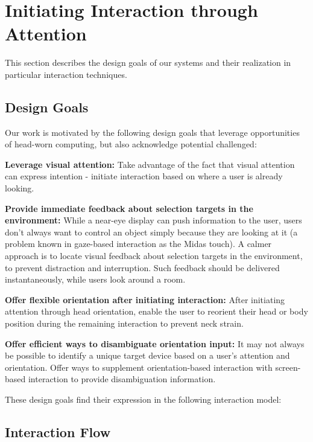 \section{Initiating Interaction through Attention}
This section describes the design goals of our systems and their realization in particular interaction techniques.

\subsection{Design Goals}
Our work is motivated by the following design goals that leverage opportunities of head-worn computing, but also acknowledge potential challenged:

{\bf Leverage visual attention:} Take advantage of the fact that visual attention can express intention - initiate interaction based on where a user is already looking. 

{\bf Provide immediate feedback about selection targets in the environment:} While a near-eye display can push information to the user, users don't always want to control an object simply because they are looking at it (a problem known in gaze-based interaction as the Midas touch). A calmer~\cite{weiser_coming_1997} approach is to locate visual feedback about selection targets in the environment, to prevent distraction and interruption. Such feedback should be delivered instantaneously, while users look around a room.

{\bf Offer flexible orientation after initiating interaction:} After initiating attention through head orientation, enable the user to reorient their head or body position during the remaining interaction to prevent neck strain.

{\bf Offer efficient ways to disambiguate orientation input:} It may not always be possible to identify a unique target device based on a user's attention and orientation. Offer ways to supplement orientation-based interaction with screen-based interaction to provide disambiguation information.

These design goals find their expression in the following interaction model:

\subsection{Interaction Flow}

